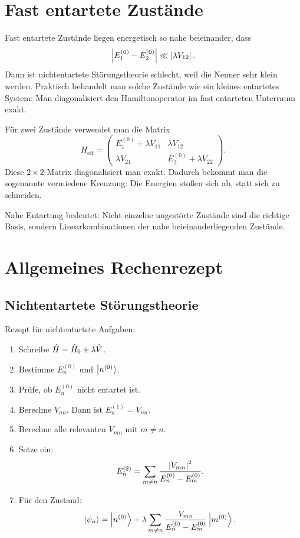 \section{Fast entartete Zustände}

Fast entartete Zustände liegen energetisch so nahe beieinander, dass
\[
    \left| E_1^{(0)}-E_2^{(0)} \right|\ll \left| \lambda V_{12} \right|.
\]
Dann ist nichtentartete Störungstheorie schlecht, weil die Nenner sehr klein werden. Praktisch behandelt man solche Zustände wie ein kleines entartetes System: Man diagonalisiert den Hamiltonoperator im fast entarteten Unterraum exakt.

Für zwei Zustände verwendet man die Matrix
\[
    H_{\mathrm{eff}}=
    \begin{pmatrix}
        E_1^{(0)}+\lambda V_{11} & \lambda V_{12}\\
        \lambda V_{21} & E_2^{(0)}+\lambda V_{22}
    \end{pmatrix}.
\]
Diese \(2\times2\)-Matrix diagonalisiert man exakt. Dadurch bekommt man die sogenannte vermiedene Kreuzung: Die Energien stoßen sich ab, statt sich zu schneiden.

\begin{conceptbox}
Nahe Entartung bedeutet: Nicht einzelne ungestörte Zustände sind die richtige Basis, sondern Linearkombinationen der nahe beieinanderliegenden Zustände.
\end{conceptbox}

\section{Allgemeines Rechenrezept}

\subsection{Nichtentartete Störungstheorie}

\begin{examtipbox}
Rezept für nichtentartete Aufgaben:
\begin{enumerate}
    \item Schreibe \(\hat H=\hat H_0+\lambda\hat V\).
    \item Bestimme \(E_n^{(0)}\) und \(\left|n^{(0)}\right\rangle\).
    \item Prüfe, ob \(E_n^{(0)}\) nicht entartet ist.
    \item Berechne \(V_{nn}\). Dann ist \(E_n^{(1)}=V_{nn}\).
    \item Berechne alle relevanten \(V_{mn}\) mit \(m\neq n\).
    \item Setze ein:
    \[
        E_n^{(2)}=\sum_{m\neq n}\frac{\left| V_{mn} \right|^2}{E_n^{(0)}-E_m^{(0)}}.
    \]
    \item Für den Zustand:
    \[
        \left|\psi_n\right\rangle=\left|n^{(0)}\right\rangle+\lambda\sum_{m\neq n}\frac{V_{mn}}{E_n^{(0)}-E_m^{(0)}}\left|m^{(0)}\right\rangle.
    \]
\end{enumerate}
\end{examtipbox}

